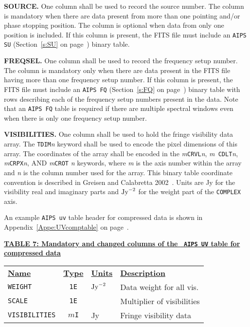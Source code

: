 \documentclass[twoside]{article}
\newcommand{\Me}[1]{\textcolor{mecol}{#1}}
\begin{document}
\Me{{\bf SOURCE\@.}  One column shall be used to record the source
number.  The column is mandatory when there are data present from
more than one pointing and/or phase stopping position.  The column is
optional when data from only one position is included.  If this column
is present, the FITS file must include an {\tt AIPS SU}
(Section~\ref{s:SU} on page~\pageref{s:SU}) binary table.
\label{rev:UVt1}}

\Me{{\bf FREQSEL\@.} One column shall be used to record the frequency
setup number.  The column is mandatory only when there are data
present in the FITS file having more than one frequency setup number.
If this column is present, the FITS file must include an {\tt AIPS FQ}
(Section~\ref{s:FQ} on page~\pageref{s:FQ}) binary table with rows
describing each of the frequency setup numbers present in the data.
Note that an {\tt AIPS FQ} table is required if there are multiple
spectral windows even when there is only one frequency setup number.
\label{rev:UVt2}}

{\bf VISIBILITIES\@.}  One column shall be used to hold the fringe
visibility data array.  The {\tt TDIM}{\it n} keyword shall be used to
encode the pixel dimensions of this array.  The coordinates of the
array shall be encoded in the {\it m}{\tt CRVL}{\it n},  {\it m}{\tt
  CDLT}{\it n},  {\it m}{\tt CRPX}{\it n}, AND {\it m}{\tt CROT}{\it
  n} keywords, where {\it m} is the axis number within the array and
{\it n} is the column number used for the array.  This binary table
coordinate convention is described in Greisen and Calabretta
2002~\cite{GC02}.  Units are Jy for the visibility real and imaginary
parts and ${\rm Jy}^{-2}$ for the weight part of the {\tt COMPLEX}
axis.

An example {\tt AIPS uv} table header for compressed data is
shown in Appendix~\ref{Appe:UVcomptable} on
page~\pageref{Appe:UVcomptable}.

\begin{center}
\underline{\bf{TABLE 7: Mandatory and changed columns of the {\tt
      AIPS UV} table for compressed data}}\\
\begin{tabular}{lcll}
\noalign{\vspace{2pt}} \label{ta:UVCcols}
\underline{{\bf Name\vphantom{y}}} & \underline{\bf{Type}} &
   \underline{{\bf Units\vphantom{y}}} & \underline{\bf{Description}} \\
\noalign{\vspace{2pt}}
{\tt WEIGHT}    & {\tt 1E} & ${\rm Jy}^{-2}$ & Data weight for all vis.\\
{\tt SCALE}     & {\tt 1E} &         & Multiplier of visibilities \\
{\tt VISIBILITIES} & {\tt $m$I} & Jy & Fringe visibility data
\end{tabular}
\end{center}
\end{document}
